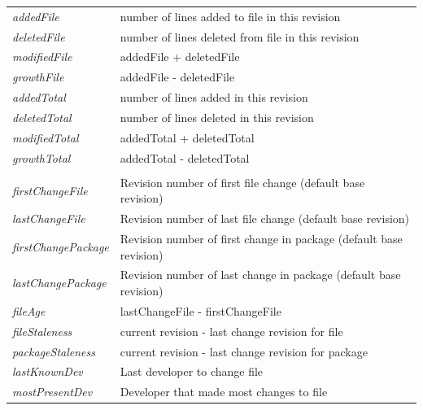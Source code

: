 \begin{longtable}[c]{@{}ll@{}}
	\textit{addedFile}          & number of lines added to file in this revision                     \\
	\textit{deletedFile}        & number of lines deleted from file in this revision                 \\
	\textit{modifiedFile}       & addedFile + deletedFile                                            \\
	\textit{growthFile}         & addedFile - deletedFile                                            \\
	\textit{addedTotal}         & number of lines added in this revision                             \\
	\textit{deletedTotal}       & number of lines deleted in this revision                           \\
	\textit{modifiedTotal}      & addedTotal + deletedTotal                                          \\
	\textit{growthTotal}        & addedTotal - deletedTotal                                          \\
	\textit{}                   &                                                                    \\
	\textit{firstChangeFile}    & Revision number of first file change (default base revision)       \\
	\textit{lastChangeFile}     & Revision number of last file change (default base revision)        \\
	\textit{firstChangePackage} & Revision number of first change in package (default base revision) \\
	\textit{lastChangePackage}  & Revision number of last change in package (default base revision)  \\
	\textit{fileAge}            & lastChangeFile - firstChangeFile                                   \\
	\textit{fileStaleness}      & current revision - last change revision for file                   \\
	\textit{packageStaleness}   & current revision - last change revision for package                \\
	\textit{lastKnownDev}       & Last developer to change file                                      \\
	\textit{mostPresentDev}     & Developer that made most changes to file                           \\* \bottomrule
\end{longtable}

